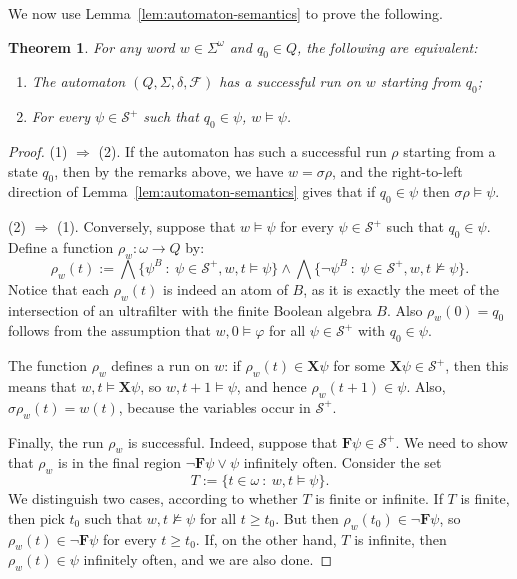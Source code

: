 \documentclass{article}
\newcommand{\X}{\mathbf{X}}
\newcommand{\F}{\mathbf{F}}
\newcommand{\cF}{\mathcal{F}}
\renewcommand{\S}{\mathcal{S}}
\renewcommand{\phi}{\varphi}
\newtheorem{theorem}{Theorem}
\begin{document}
We now use Lemma~\ref{lem:automaton-semantics} to prove the following.
\begin{theorem} For any word $w \in \Sigma^\omega$ and $q_0 \in Q$, the
	following are equivalent: \begin{enumerate} \item The automaton $(Q,
		\Sigma, \delta, \cF)$ has a successful run on $w$ starting from
	$q_0$; \item For every $\psi \in \S^+$ such that $q_0 \in \psi$, $w
\models \psi$.  \end{enumerate} \end{theorem} \begin{proof}

(1) $\Rightarrow$ (2). If the automaton has such a successful run $\rho$
starting from a state $q_0$, then by the remarks above, we have $w =
\sigma\rho$, and the right-to-left direction of
Lemma~\ref{lem:automaton-semantics} gives that if $q_0 \in \psi$ then
$\sigma\rho \models \psi$. 

(2) $\Rightarrow$ (1). Conversely, suppose that $w \models \psi$ for every $\psi
\in \S^+$ such that $q_0 \in \psi$.  Define a function $\rho_w \colon \omega \to
Q$ by: 
%
\[ \rho_w(t) := \bigwedge \{ \psi^B \ \colon \ \psi \in \S^+, w, t
		\models \psi\} \wedge \bigwedge \{ \neg \psi^B \ \colon \ \psi
	\in \S^+, w, t \not\models \psi\}.\] 
%
Notice that each $\rho_w(t)$ is indeed an atom of $B$, as it is exactly
the meet of the intersection of an ultrafilter with the finite Boolean
algebra $B$. Also $\rho_w(0) = q_0$ follows from the assumption that $w,
0 \models \phi$ for all $\psi \in \S^+$ with $q_0 \in \psi$.

The function $\rho_w$ defines a run on $w$: if $\rho_w(t) \in \X \psi$ for some
$\X \psi \in \S^+$, then this means that $w, t \models \X \psi$, so $w, t + 1
\models \psi$, and hence $\rho_w(t+1) \in \psi$.  Also, $\sigma\rho_w(t) =
w(t)$, because the variables occur in $\mathcal{S}^+$.

Finally, the run $\rho_w$ is successful. Indeed, suppose that $\F \psi \in
\S^+$. We need to show that $\rho_w$ is in the final region $\neg \F \psi \vee
\psi$ infinitely often. Consider the set \[ T := \{t \in \omega \ \colon \ w, t
\models \psi\}.\] We distinguish two cases, according to whether $T$ is finite
or infinite. If $T$ is finite, then pick $t_0$ such that  $w, t \not\models
\psi$ for all $t \geq t_0$. But then $\rho_w(t_0) \in \neg \F \psi$, so
$\rho_w(t) \in \neg \F \psi$ for every $t \geq t_0$. If, on the other hand, $T$
is infinite, then $\rho_w(t) \in \psi$ infinitely often, and we are also done.
\end{proof}
\end{document}
